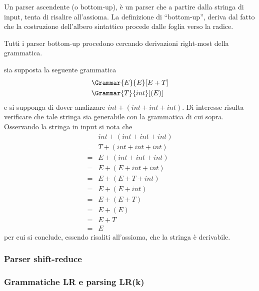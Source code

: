 \documentclass{subfiles}
\begin{document}
Un parser ascendente (o bottom-up), è un parser che a partire dalla stringa di input, tenta di risalire all'assioma.
La definizione di ``bottom-up'', deriva dal fatto che la costruzione dell'albero sintattico procede dalle foglia verso la radice.

\begin{Note*}
    Tutti i parser bottom-up procedono cercando  derivazioni right-most della grammatica.

    \begin{Example*}
        sia supposta la seguente grammatica
        $$\begin{aligned}
                 & \Grammar{E}{E}[E + T] \\
                 & \Grammar{T}{int}[(E)]
            \end{aligned}$$
        e si supponga di dover analizzare $int  + (int + int + int)$.
        Di interesse risulta verificare che tale stringa sia generabile con la grammatica di cui sopra.
        Osservando la stringa in input si nota che
        $$\begin{aligned}
                  & int + (int + int + int) \\
                = & T + (int + int + int)   \\
                = & E + (int + int + int)   \\
                = & E + (E + int + int)     \\
                = & E + (E + T + int)       \\
                = & E + (E + int)           \\
                = & E + (E + T)             \\
                = & E + (E)                 \\
                = & E + T                   \\
                = & E
            \end{aligned}$$
        per cui si conclude, essendo risaliti all'assioma, che la stringa è derivabile.
    \end{Example*}
\end{Note*}

\subsubsection{Parser shift-reduce}


\subsubsection{Grammatiche LR e parsing LR(k)}

\end{document}
